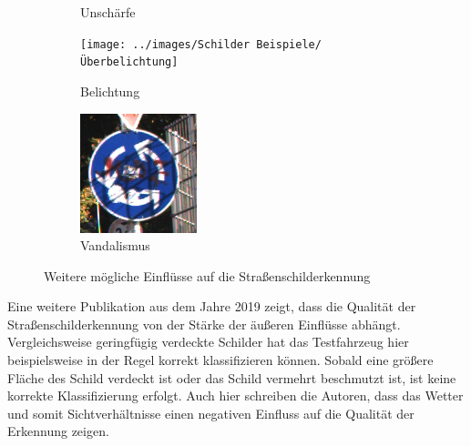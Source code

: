 \begin{figure}[H]
\begin{subfigure}[b]{0.125\textwidth}
       \caption{Unschärfe}
       \label{fig:motion-blur}
   \end{subfigure}
   \hspace{3em}%
   \begin{subfigure}[b]{0.125\textwidth}
       \centering
       \texttt{[image: ../images/Schilder Beispiele/Überbelichtung]}
       \caption{Belichtung}
       \label{fig:ueberbelichtung}
   \end{subfigure}
   \hspace{3em}%
   \begin{subfigure}[b]{0.125\textwidth}
    \centering
    \includegraphics[height=\textwidth]{../images/Schilder Beispiele/Vandalismus.png}
    \caption{Vandalismus}
    \label{fig:vandalism}
   \end{subfigure}
      \caption{Weitere mögliche Einflüsse auf die Straßenschilderkennung}
      \label{fig:einfluesse-strscherkennung2}
\end{figure}

Eine weitere Publikation aus dem Jahre 2019 zeigt, dass die Qualität der Straßenschilderkennung von der Stärke der äußeren Einflüsse abhängt. Vergleichsweise geringfügig verdeckte Schilder hat das Testfahrzeug hier beispielsweise in der Regel korrekt klassifizieren können. Sobald eine größere Fläche des Schild verdeckt ist oder das Schild vermehrt beschmutzt ist, ist keine korrekte Klassifizierung erfolgt. Auch hier schreiben die Autoren, dass das Wetter und somit Sichtverhältnisse einen negativen Einfluss auf die Qualität der Erkennung zeigen. \cite{traffic-sign-anomalies}

